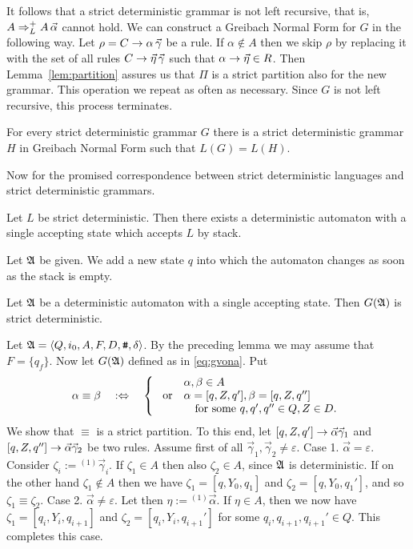 It follows that a strict deterministic grammar is not left 
recursive, that is, $A \Rightarrow_L^+ A\, \vec{\alpha}$ cannot hold. 
We can construct a Greibach Normal Form for $G$ in the following way. Let
$\rho = C \rightarrow \alpha \, \vec{\gamma}$  be a rule. If
$\alpha \not\in A$ then we skip $\rho$ by replacing it with the
set of all rules $C \rightarrow \vec{\eta}\, \vec{\gamma}$ such that
$\alpha \rightarrow \vec{\eta} \in R$.  Then Lemma~\ref{lem:partition}
assures us that $\Pi$ is a strict partition also for the new
grammar. This operation we repeat as often as necessary. Since
$G$ is not left recursive, this process terminates.
\begin{thm}
For every strict deterministic grammar $G$ there is a strict 
deterministic grammar $H$ in Greibach Normal Form such that
$L(G) = L(H)$.
\end{thm}
Now for the promised correspondence between strict deterministic
languages and strict deterministic grammars.
\begin{lem}
Let $L$ be strict deterministic. Then there exists a
deterministic automaton with a single accepting state
which accepts $L$ by stack.
\end{lem}
\proofbeg
Let $\mathfrak{A}$ be given. We add a new state $q$ into which the
automaton changes as soon as the stack is empty.
\proofend
\begin{lem}
Let $\mathfrak{A}$ be a deterministic automaton with a single accepting
state. Then $G(\mathfrak{A})$ is strict deterministic.
\end{lem}
\proofbeg
Let $\mathfrak{A} = \langle Q, i_0, A, F, D, \mbox{\tt \#}, \delta\rangle$. By the preceding
lemma we may assume that $F = \{q_f\}$. Now let $G(\mathfrak{A})$ defined as in
\eqref{eq:gvona}. Put
\begin{equation}
\alpha \equiv \beta \quad:\Leftrightarrow\quad
\left\{
    \begin{array}{ll}
                        & \alpha, \beta \in A \\
    \text{ or}   & \alpha = [q,Z,q'], \beta = [q,Z,q''] \\
    & \quad \text{for some } q, q', q'' \in Q, Z \in D.
    \end{array}
\right.
\end{equation}
We show that $\equiv$ is a strict partition. To this end,
let $[q,Z,q'] \rightarrow \vec{\alpha}\vec{\gamma}_1$ and
$[q,Z,q''] \rightarrow \vec{\alpha}\vec{\gamma}_2$ be two rules.
Assume first of all $\vec{\gamma}_1,
\vec{\gamma}_2 \neq \varepsilon$.
Case 1. $\vec{\alpha} = \varepsilon$. Consider
$\zeta_i := {^{(1)}\vec{\gamma}_i}$. If $\zeta_1 \in A$
then also $\zeta_2 \in A$, since $\mathfrak{A}$ is deterministic.
If on the other hand $\zeta_1 \not\in A$ then we have
$\zeta_1 = [q, Y_0, q_1]$ and
$\zeta_2 = [q, Y_0, q_1']$, and so $\zeta_1 \equiv \zeta_2$.
Case 2. $\vec{\alpha} \neq \varepsilon$. Let then
$\eta := {^{(1)}\vec{\alpha}}$. If $\eta \in A$, then we now have
$\zeta_1 = [q_i, Y_i, q_{i+1}]$ and
$\zeta_2 = [q_i, Y_i, q_{i+1}']$ for some
$q_i, q_{i+1}, q_{i+1}' \in Q$. This completes this case.

